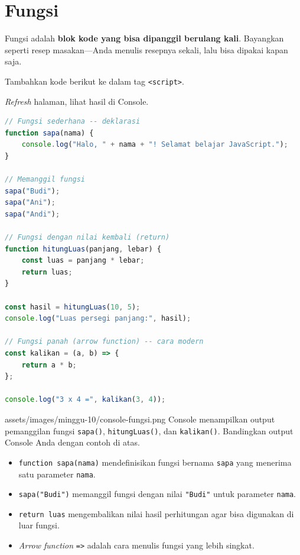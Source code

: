 \section{Fungsi}
\label{sec:10-fungsi}

Fungsi adalah \textbf{blok kode yang bisa dipanggil berulang kali}. Bayangkan seperti resep masakan---Anda menulis resepnya sekali, lalu bisa dipakai kapan saja.

\begin{langkah}
  \item Tambahkan kode berikut ke dalam tag \texttt{<script>}.
  \item \emph{Refresh} halaman, lihat hasil di Console.
\end{langkah}

\begin{lstlisting}[language=JavaScript, caption={Fungsi deklarasi, nilai kembali, dan \emph{arrow function}}, label={lst:10-fungsi}]
// Fungsi sederhana -- deklarasi
function sapa(nama) {
    console.log("Halo, " + nama + "! Selamat belajar JavaScript.");
}

// Memanggil fungsi
sapa("Budi");
sapa("Ani");
sapa("Andi");

// Fungsi dengan nilai kembali (return)
function hitungLuas(panjang, lebar) {
    const luas = panjang * lebar;
    return luas;
}

const hasil = hitungLuas(10, 5);
console.log("Luas persegi panjang:", hasil);

// Fungsi panah (arrow function) -- cara modern
const kalikan = (a, b) => {
    return a * b;
};

console.log("3 x 4 =", kalikan(3, 4));
\end{lstlisting}

\begin{tangkapanlayar}
  {assets/images/minggu-10/console-fungsi.png}
  {Console menampilkan output pemanggilan fungsi \texttt{sapa()}, \texttt{hitungLuas()}, dan \texttt{kalikan()}.}
  {Bandingkan output Console Anda dengan contoh di atas.}
\end{tangkapanlayar}

\begin{itemize}
  \item \texttt{function sapa(nama)} mendefinisikan fungsi bernama \texttt{sapa} yang menerima satu parameter \texttt{nama}.
  \item \texttt{sapa("Budi")} memanggil fungsi dengan nilai \texttt{"Budi"} untuk parameter \texttt{nama}.
  \item \texttt{return luas} mengembalikan nilai hasil perhitungan agar bisa digunakan di luar fungsi.
  \item \emph{Arrow function} \texttt{=>} adalah cara menulis fungsi yang lebih singkat.
\end{itemize}

